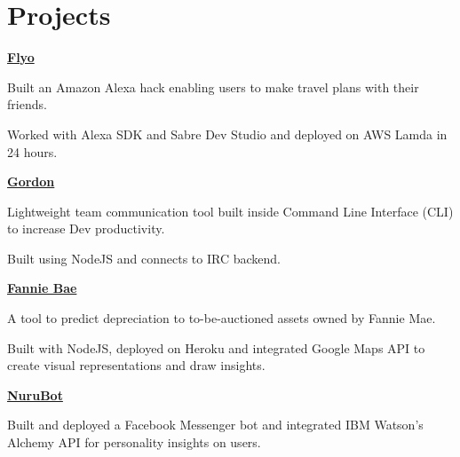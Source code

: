 \documentclass[]{deedy-resume-openfont}
\begin{document}
\begin{minipage}[t]{1.00\textwidth}

\section{Projects}

\runsubsection \textbf{\href{https://www.github.com/rahulsonwalkar/flyo}{Flyo}}
\begin{tightemize}
\item Built an Amazon Alexa hack enabling users to make travel plans with their friends. \item Worked with Alexa SDK and Sabre Dev Studio and deployed on AWS Lamda in 24 hours.
\end{tightemize}
\sectionsep

\runsubsection \textbf{\href{https://www.github.com/rahulsonwalkar/Gordon}{Gordon}}
\experienceDate{}
\begin{tightemize}
\item Lightweight team communication tool built inside Command Line Interface (CLI) to increase Dev productivity. \item Built using NodeJS and connects to IRC backend.
\end{tightemize}
\sectionsep

\runsubsection \textbf{\href{https://www.github.com/rahulsonwalkar}{Fannie Bae}}
\begin{tightemize}
\item A tool to predict depreciation to to-be-auctioned assets owned by Fannie Mae.\item Built with NodeJS, deployed on Heroku and integrated Google Maps API to create visual representations and draw insights.
\end{tightemize}
\sectionsep

\runsubsection \textbf{\href{https://www.github.com/rahulsonwalkar}{NuruBot}}
\begin{tightemize}
\item Built and deployed a Facebook Messenger bot and integrated IBM Watson's Alchemy API for personality insights on users.
\end{tightemize}
\sectionsep



\end{minipage}
\end{document}
